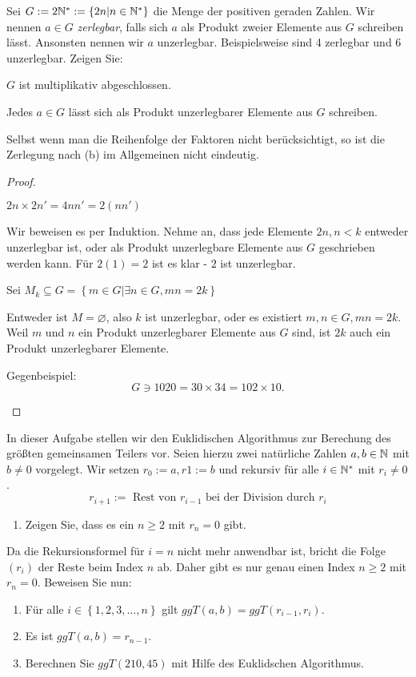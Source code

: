 \begin{Problem}
	Sei $G := 2\mathbb{N}^* := \{2n | n \in \mathbb{N}^* \}$ die Menge der positiven geraden Zahlen. Wir nennen $a \in G$ \emph{zerlegbar}, falls sich $a$ als Produkt zweier Elemente aus $G$ schreiben lässt. Ansonsten nennen wir $a$ unzerlegbar. Beispielsweise sind 4 zerlegbar und 6 unzerlegbar. Zeigen Sie:
	\begin{parts}
		\item $G$ ist multiplikativ abgeschlossen.
		\item Jedes $a\in G$ l\"{a}sst sich als Produkt unzerlegbarer Elemente aus $G$ schreiben.
		\item Selbst wenn man die Reihenfolge der Faktoren nicht berücksichtigt, so ist die Zerlegung nach (b) im Allgemeinen nicht eindeutig.
	\end{parts}
\end{Problem}

\begin{proof}
	\begin{parts}
	\item $2n\times 2n'=4nn'=2(nn')$
	\item Wir beweisen es per Induktion. Nehme an, dass jede Elemente  $2n, n < k$ entweder unzerlegbar ist, oder als Produkt unzerlegbare Elemente aus $G$ geschrieben werden kann. F\"{u}r $2(1)=2$ ist es klar - $2$ ist unzerlegbar.
		
		Sei $M_k\subseteq G =\left\{ m\in G| \exists n\in G, mn=2k\right\} $
		
		Entweder ist $M=\varnothing$, also $k$ ist unzerlegbar, oder es existiert $m,n\in G, mn=2k$. Weil $m$ und $n$ ein Produkt unzerlegbarer Elemente aus $G$ sind, ist $2k$ auch ein Produkt unzerlegbarer Elemente.
	\item Gegenbeispiel:
		\[
		G\ni 1020=30\times 34=102\times 10
		.\] 
	\end{parts}
\end{proof}
\begin{Problem}
	In dieser Aufgabe stellen wir den Euklidischen Algorithmus zur Berechung des größten gemeinsamen Teilers vor. Seien hierzu zwei natürliche Zahlen $a, b \in \mathbb{N}$ mit $b \neq 0$ vorgelegt. Wir setzen $r_0 := a, r1 := b$ und rekursiv für alle $i \in \mathbb{N}^*$ mit $r_i \neq 0$.
		\[r_{i+1}:=\text{ Rest von }r_{i-1}\text{ bei der Division durch }r_i\]
	\begin{enumerate}[label=(\alph*)]
	\item	Zeigen Sie, dass es ein $n\ge 2$ mit  $r_n=0$ gibt.
	\end{enumerate}	
Da die Rekursionsformel für $i = n$ nicht mehr anwendbar ist, bricht die Folge $(r_i)$ der Reste beim Index $n$ ab. Daher gibt es nur genau einen Index $n \ge 2$ mit $r_n = 0$. Beweisen Sie nun:
\begin{enumerate}[resume*]
\item F\"{u}r alle $i\in \left\{ 1,2,3,\dots,n \right\} $ gilt $ggT(a,b)=ggT(r_{i-1},r_i)$.
\item Es ist $ggT(a,b)=r_{n-1}$.
\item Berechnen Sie $ggT(210,45)$ mit Hilfe des Euklidschen Algorithmus.
\end{enumerate}
\end{Problem}

